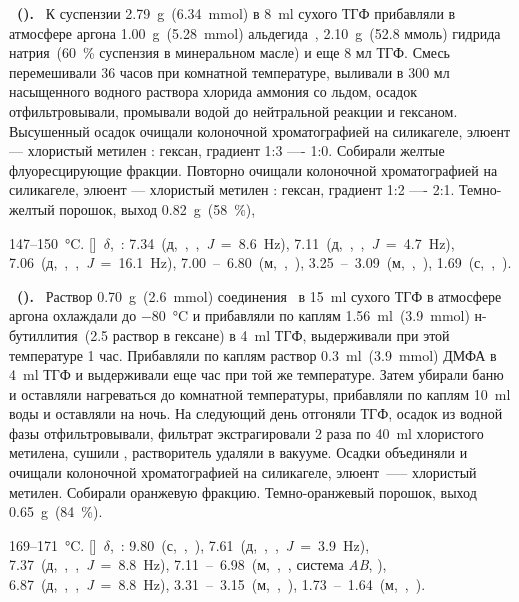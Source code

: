 \textbf{~().}~
К суспензии \SI{2.79}{\gram}~(\SI{6.34}{\mmol})  в \SI{8}{\ml} сухого ТГФ прибавляли в атмосфере аргона \SI{1.00}{\gram}~(\SI{5.28}{\mmol}) альдегида~, \SI{2.10}{\gram}~(52.8 ммоль) гидрида натрия~(\SI{60}{\percent} суспензия в минеральном масле) и еще 8 мл ТГФ. 
Смесь перемешивали 36 часов при комнатной температуре, выливали в 300 мл насыщенного водного раствора хлорида аммония со льдом, осадок отфильтровывали, промывали водой до нейтральной реакции и гексаном. 
Высушенный осадок очищали колоночной хроматографией на силикагеле, элюент — хлористый метилен : гексан, градиент 1:3 —- 1:0. 
Собирали желтые флуоресцирующие фракции. 
Повторно очищали колоночной хроматографией на силикагеле, элюент — хлористый метилен : гексан, градиент 1:2 —- 2:1. 
Темно-желтый порошок, выход \SI{0.82}{\gram}~(\SI{58}{\percent}), 
\begin{experimental}
     147--\SI{150}{\celsius}.
    []~$\delta$,~\si{\ppm}: 7.34~(д,~,~,~\textit{J}~=~8.6~\si{\hertz}), 7.11~(д,~,~,~\textit{J}~=~4.7~\si{\hertz}), 7.06~(д,~,~,~\textit{J}~=~16.1~\si{\hertz}), 7.00~--~6.80~(м,~,~), 3.25~--~3.09~(м,~,~), 1.69~(с,~,~).
\end{experimental}

\textbf{~().}~
Раствор \SI{0.70}{\gram}~(\SI{2.6}{\mmol}) соединения~ в \SI{15}{\ml} сухого ТГФ в атмосфере аргона охлаждали до \SI{-80}{\celsius} и прибавляли по каплям \SI{1.56}{\ml}~(\SI{3.9}{\mmol}) н-бутиллития~(\SI{2.5}{\Molar} раствор в гексане) в \SI{4}{\ml} ТГФ, выдерживали при этой температуре 1 час. 
Прибавляли по каплям раствор \SI{0.3}{\ml}~(\SI{3.9}{\mmol}) ДМФА в \SI{4}{\ml} ТГФ и выдерживали еще час при той же температуре. 
Затем убирали баню и оставляли нагреваться до комнатной температуры, прибавляли по каплям \SI{10}{\ml} воды и оставляли на ночь. 
На следующий день отгоняли ТГФ, осадок из водной фазы отфильтровывали, фильтрат экстрагировали 2 раза по \SI{40}{\ml} хлористого метилена, сушили , растворитель удаляли в вакууме. Осадки объединяли и очищали колоночной хроматографией на силикагеле, элюент~—-- хлористый метилен. 
Собирали оранжевую фракцию. Темно-оранжевый порошок, выход \SI{0.65}{\gram}~(\SI{84}{\percent}).
\begin{experimental}
     169--\SI{171}{\celsius}.
    []~$\delta$,~\si{\ppm}: 9.80~(с,~,~), 7.61~(д,~,~,~\textit{J}~=~3.9~\si{\hertz}), 7.37~(д,~,~,~\textit{J}~=~8.8~\si{\hertz}), 7.11~--~6.98~(м,~,~, система \emph{AB}, ), 6.87~(д,~,~,~\textit{J}~=~8.8~\si{\hertz}), 3.31~--~3.15~(м,~,~), 1.73~--~1.64~(м,~,~).
\end{experimental}

